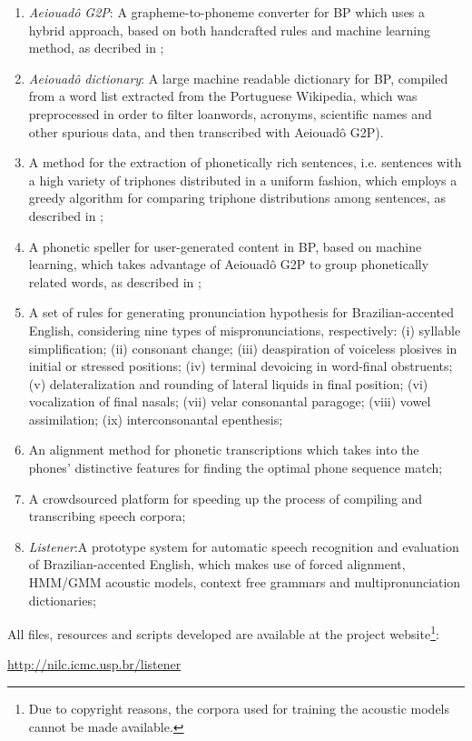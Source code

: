 \begin{enumerate}
 \item \emph{Aeiouad\^o G2P}: A grapheme-to-phoneme converter for \ac{BP} which uses a hybrid approach, based on both handcrafted rules and machine learning method, as decribed in \citeauthor{Mendonca2014} \cite{Mendonca2014};
 \item \emph{Aeiouad\^o dictionary}: A large machine readable dictionary for \ac{BP}, compiled from a word list extracted from the Portuguese Wikipedia, which was preprocessed in order to filter loanwords, acronyms, scientific names and other spurious data, and then transcribed with Aeiouad\^o G2P).
 \item A method for the extraction of phonetically rich sentences, i.e. sentences with a high variety of triphones distributed in a uniform fashion, which employs a greedy algorithm for comparing triphone distributions among sentences, as described in \citeauthor{Mendonca2014b} \cite{Mendonca2014b};
 \item A phonetic speller for user-generated content in \ac{BP}, based on machine learning, which takes advantage of Aeiouad\^o G2P to group phonetically related words, as described in \citeauthor{Mendonca2015} \cite{Mendonca2015}; 
 \item A set of rules for generating pronunciation hypothesis for Brazilian-accented English, considering nine types of mispronunciations, respectively: (i) syllable simplification; (ii) consonant change; (iii) deaspiration of voiceless plosives in initial or stressed positions; (iv) terminal devoicing in word-final obstruents; (v) delateralization and rounding of lateral liquids in final position; (vi) vocalization of final nasals; (vii) velar consonantal paragoge; (viii) vowel assimilation; (ix) interconsonantal epenthesis;
 \item An alignment method for phonetic transcriptions which takes into the phones' distinctive features for finding the optimal phone sequence match;
 \item A crowdsourced platform for speeding up the process of compiling and transcribing speech corpora;
 \item \emph{Listener}:A prototype system for automatic speech recognition and evaluation of Brazilian-accented English, which makes use of forced alignment, \ac{HMM}/\ac{GMM} acoustic models, context free grammars and multipronunciation dictionaries;
\end{enumerate}

All files, resources and scripts developed are available at the project website\footnote{Due to copyright reasons, the corpora used for training the acoustic models cannot be made available.}: 
\begin{center}
 \url{http://nilc.icmc.usp.br/listener}
\end{center}

